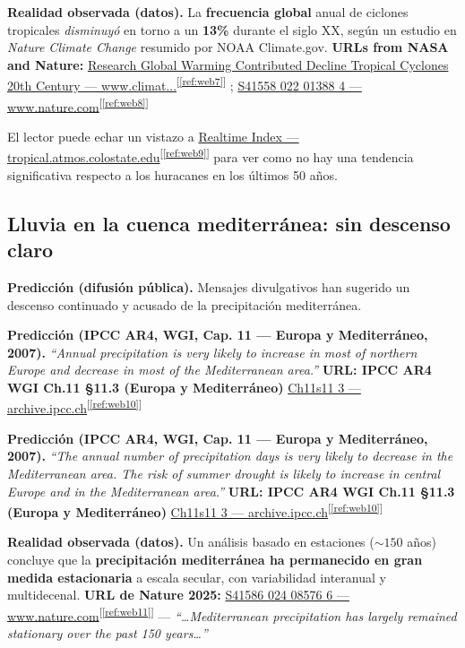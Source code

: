 \documentclass[
  10pt,
  a4paper,
  DIV=11,
  numbers=noendperiod,
  open=any]{scrreprt}
\numberwithin{equation}{chapter}
\numberwithin{equation}{section}
\renewcommand{\[}{\begin{equation}}
\renewcommand{\]}{\end{equation}}
\newcommand{\refweb}[3]{%
  \href{#1}{#2}\textsuperscript{[\ref{ref:#3}]}%
}
\begin{document}
\textbf{Realidad observada (datos).}
La \textbf{frecuencia global} anual de ciclones tropicales \emph{disminuyó} en torno a un \textbf{13\%} durante el siglo XX, según un estudio en \textit{Nature Climate Change} resumido por NOAA Climate.gov.
\textbf{URLs from NASA and Nature:} \refweb{https://www.climate.gov/news-features/feed/research-global-warming-contributed-decline-tropical-cyclones-20th-century/}{Research Global Warming Contributed Decline Tropical Cyclones 20th Century — www.climat...}{web7}; \refweb{https://www.nature.com/articles/s41558-022-01388-4}{S41558 022 01388 4 — www.nature.com}{web8}
El lector puede echar un vistazo a \refweb{https://tropical.atmos.colostate.edu/Realtime/index.php?arch\&loc=global}{Realtime Index — tropical.atmos.colostate.edu}{web9} para ver como no hay una tendencia significativa respecto a los huracanes en los últimos 50 años.


\medskip

\subsection{Lluvia en la cuenca mediterránea: sin descenso claro}

\textbf{Predicción (difusión pública).}
Mensajes divulgativos han sugerido un descenso continuado y acusado de la precipitación mediterránea.

\textbf{Predicción (IPCC AR4, WGI, Cap. 11 — Europa y Mediterráneo, 2007).}
\emph{“Annual precipitation is very likely to increase in most of northern Europe and decrease in most of the Mediterranean area.”}
\textbf{URL: IPCC AR4 WGI Ch.11 §11.3 (Europa y Mediterráneo)} \refweb{https://archive.ipcc.ch/publications_and_data/ar4/wg1/en/ch11s11-3.html}{Ch11s11 3 — archive.ipcc.ch}{web10}

\textbf{Predicción (IPCC AR4, WGI, Cap. 11 — Europa y Mediterráneo, 2007).}
\emph{“The annual number of precipitation days is very likely to decrease in the Mediterranean area. The risk of summer drought is likely to increase in central Europe and in the Mediterranean area.”}
\textbf{URL: IPCC AR4 WGI Ch.11 §11.3 (Europa y Mediterráneo)} \refweb{https://archive.ipcc.ch/publications_and_data/ar4/wg1/en/ch11s11-3.html}{Ch11s11 3 — archive.ipcc.ch}{web10}


\textbf{Realidad observada (datos).}
Un análisis basado en estaciones (\(\sim150\) años) concluye que la \textbf{precipitación mediterránea ha permanecido en gran medida estacionaria} a escala secular, con variabilidad interanual y multidecenal.
\textbf{URL de Nature 2025:} \refweb{https://www.nature.com/articles/s41586-024-08576-6}{S41586 024 08576 6 — www.nature.com}{web11} — \emph{“\dots{}Mediterranean precipitation has largely remained stationary over the past 150 years\dots{}”}
\end{document}
